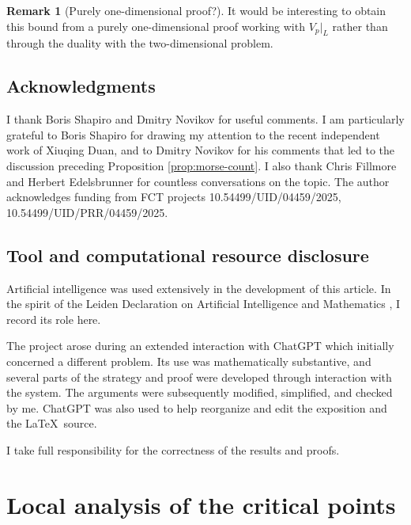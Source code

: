 \documentclass[leqno,11pt]{amsart}
\numberwithin{equation}{section}
\theoremstyle{definition}
\newtheorem{remark}{Remark}
\begin{document}
	\begin{remark}[Purely one-dimensional proof?] It would be interesting to obtain this bound from a purely one-dimensional proof working with $V_p|_L$ rather than through the duality with the two-dimensional problem.
	\end{remark}
	
	\subsection*{Acknowledgments}
	
	I thank Boris Shapiro and Dmitry Novikov for useful comments. I am particularly grateful to Boris Shapiro for drawing my attention to the recent independent work of Xiuqing Duan, and to Dmitry Novikov for his comments that led to the discussion preceding Proposition \ref{prop:morse-count}. I also thank Chris Fillmore and Herbert Edelsbrunner for countless conversations on the topic. The author acknowledges funding from FCT projects 10.54499/UID/04459/2025, 10.54499/UID/PRR/04459/2025.
	
	\subsection*{Tool and computational resource disclosure}
	
	Artificial intelligence was used extensively in the development of this article. In the spirit of the Leiden Declaration on Artificial Intelligence and Mathematics \cite{LeidenDeclaration}, I record its role here.
	
	The project arose during an extended interaction with ChatGPT which initially concerned a different problem. Its use was mathematically substantive, and several parts of the strategy and proof were developed through interaction with the system. The arguments were subsequently modified, simplified, and checked by me. ChatGPT was also used to help reorganize and edit the exposition and the \LaTeX\ source.
	
	I take full responsibility for the correctness of the results and proofs.
	
		
	
	\section{Local analysis of the critical points}\label{sec:local}
	
\end{document}
